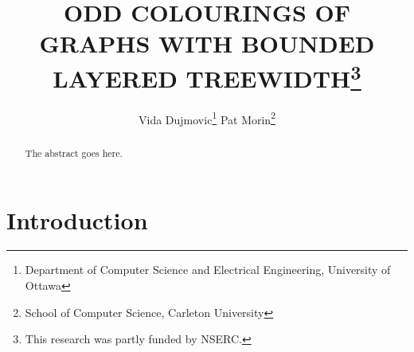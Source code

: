 \documentclass{patmorin}
\title{\MakeUppercase{Odd Colourings of Graphs with Bounded Layered Treewidth}\thanks{This research was partly funded by NSERC.}}
\author{%
  Vida Dujmovic\thanks{Department of Computer Science and Electrical Engineering, University of Ottawa}\qquad
  Pat Morin\thanks{School of Computer Science, Carleton University}
}
\date{}
\begin{document}
\maketitle

\begin{abstract}
  The abstract goes here.
\end{abstract}

%

\section{Introduction}









\end{document}
